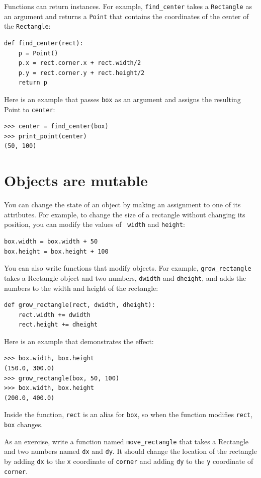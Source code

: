 \documentclass[10pt]{book}
\begin{document}
Functions can return instances.  For example, \verb"find_center"
takes a {\tt Rectangle} as an argument and returns a {\tt Point}
that contains the coordinates of the center of the {\tt Rectangle}:

\begin{verbatim}
def find_center(rect):
    p = Point()
    p.x = rect.corner.x + rect.width/2
    p.y = rect.corner.y + rect.height/2
    return p
\end{verbatim}
%
Here is an example that passes {\tt box} as an argument and assigns
the resulting Point to {\tt center}:

\begin{verbatim}
>>> center = find_center(box)
>>> print_point(center)
(50, 100)
\end{verbatim}
%

\section{Objects are mutable}

You can change the state of an object by making an assignment to one of
its attributes.  For example, to change the size of a rectangle
without changing its position, you can modify the values of {\tt
width} and {\tt height}:

\begin{verbatim}
box.width = box.width + 50
box.height = box.height + 100
\end{verbatim}
%
You can also write functions that modify objects.  For example,
\verb"grow_rectangle" takes a Rectangle object and two numbers,
{\tt dwidth} and {\tt dheight}, and adds the numbers to the
width and height of the rectangle:

\begin{verbatim}
def grow_rectangle(rect, dwidth, dheight):
    rect.width += dwidth
    rect.height += dheight
\end{verbatim}
%
Here is an example that demonstrates the effect:

\begin{verbatim}
>>> box.width, box.height
(150.0, 300.0)
>>> grow_rectangle(box, 50, 100)
>>> box.width, box.height
(200.0, 400.0)
\end{verbatim}
%
Inside the function, {\tt rect} is an
alias for {\tt box}, so when the function modifies {\tt rect}, 
{\tt box} changes.

As an exercise, write a function named \verb"move_rectangle" that takes
a Rectangle and two numbers named {\tt dx} and {\tt dy}.  It
should change the location of the rectangle by adding {\tt dx}
to the {\tt x} coordinate of {\tt corner} and adding {\tt dy}
to the {\tt y} coordinate of {\tt corner}.
\end{document}
